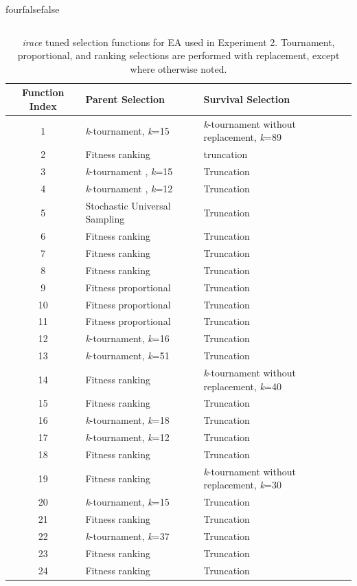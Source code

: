 \documentclass[times,12pt,titlepage]{mstogs}
\begin{document}
\begin{ThesisAppendix}{four}{false}{false}
\begin{table}
\begin{tabular}{cccc}
  \bottomrule
\end{tabular}
\end{table}

\begin{table}
\centering
\caption{\textit{irace} tuned selection functions for EA used in Experiment 2. Tournament, proportional, and ranking selections are performed with replacement, except where otherwise noted.}
\label{tab:iRaceBasicEASelection}
  \begin{tabular}{cp{5cm}p{5cm}}
	\toprule
    Function Index & Parent Selection & Survival Selection \\
    \midrule
	1 & \textit{k}-tournament, \textit{k}=15 & \textit{k}-tournament without replacement, \textit{k}=89  \\ 
	\hline
	2 & Fitness ranking & truncation\\
	\hline
	3 & \textit{k}-tournament , \textit{k}=15 & Truncation \\ 
	\hline
	4 & \textit{k}-tournament , \textit{k}=12 & Truncation \\ 
	\hline
	5 & Stochastic Universal Sampling & Truncation\\
	\hline
	6 & Fitness ranking & Truncation  \\ 
	\hline
	7 & Fitness ranking & Truncation   \\ 
	\hline
	8 & Fitness ranking & Truncation   \\ 
	\hline
	9 & Fitness proportional & Truncation   \\ 
	\hline
	10 & Fitness proportional & Truncation   \\ 
	\hline
	11 & Fitness proportional & Truncation   \\   
	\hline
	12 & \textit{k}-tournament, \textit{k}=16 & Truncation   \\ 
	\hline
	13 & \textit{k}-tournament, \textit{k}=51 & Truncation    \\ 
	\hline
	14 & Fitness ranking & \textit{k}-tournament without replacement, \textit{k}=40   \\ 
	\hline
	15 & Fitness ranking & Truncation   \\ 
	\hline
	16 &  \textit{k}-tournament, \textit{k}=18 & Truncation  \\ 
	\hline
	17 &  \textit{k}-tournament, \textit{k}=12 & Truncation  \\ 
	\hline
	18 &  Fitness ranking & Truncation  \\ 
	\hline
	19 &  Fitness ranking & \textit{k}-tournament without replacement, \textit{k}=30  \\ 
	\hline
	20 &  \textit{k}-tournament, \textit{k}=15 & Truncation   \\ 
	\hline
	21 &  Fitness ranking & Truncation  \\ 
	\hline
	22 &  \textit{k}-tournament, \textit{k}=37 & Truncation  \\ 
	\hline
	23 &  Fitness ranking & Truncation  \\ 
	\hline
	24 &  Fitness ranking & Truncation  \\ 
	

\end{tabular}
\end{table}
\end{ThesisAppendix}
\end{document}
